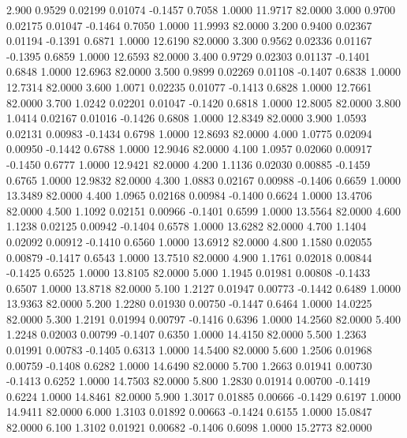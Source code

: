    2.900   0.9529   0.02199   0.01074  -0.1457   0.7058   1.0000  11.9717  82.0000
   3.000   0.9700   0.02175   0.01047  -0.1464   0.7050   1.0000  11.9993  82.0000
   3.200   0.9400   0.02367   0.01194  -0.1391   0.6871   1.0000  12.6190  82.0000
   3.300   0.9562   0.02336   0.01167  -0.1395   0.6859   1.0000  12.6593  82.0000
   3.400   0.9729   0.02303   0.01137  -0.1401   0.6848   1.0000  12.6963  82.0000
   3.500   0.9899   0.02269   0.01108  -0.1407   0.6838   1.0000  12.7314  82.0000
   3.600   1.0071   0.02235   0.01077  -0.1413   0.6828   1.0000  12.7661  82.0000
   3.700   1.0242   0.02201   0.01047  -0.1420   0.6818   1.0000  12.8005  82.0000
   3.800   1.0414   0.02167   0.01016  -0.1426   0.6808   1.0000  12.8349  82.0000
   3.900   1.0593   0.02131   0.00983  -0.1434   0.6798   1.0000  12.8693  82.0000
   4.000   1.0775   0.02094   0.00950  -0.1442   0.6788   1.0000  12.9046  82.0000
   4.100   1.0957   0.02060   0.00917  -0.1450   0.6777   1.0000  12.9421  82.0000
   4.200   1.1136   0.02030   0.00885  -0.1459   0.6765   1.0000  12.9832  82.0000
   4.300   1.0883   0.02167   0.00988  -0.1406   0.6659   1.0000  13.3489  82.0000
   4.400   1.0965   0.02168   0.00984  -0.1400   0.6624   1.0000  13.4706  82.0000
   4.500   1.1092   0.02151   0.00966  -0.1401   0.6599   1.0000  13.5564  82.0000
   4.600   1.1238   0.02125   0.00942  -0.1404   0.6578   1.0000  13.6282  82.0000
   4.700   1.1404   0.02092   0.00912  -0.1410   0.6560   1.0000  13.6912  82.0000
   4.800   1.1580   0.02055   0.00879  -0.1417   0.6543   1.0000  13.7510  82.0000
   4.900   1.1761   0.02018   0.00844  -0.1425   0.6525   1.0000  13.8105  82.0000
   5.000   1.1945   0.01981   0.00808  -0.1433   0.6507   1.0000  13.8718  82.0000
   5.100   1.2127   0.01947   0.00773  -0.1442   0.6489   1.0000  13.9363  82.0000
   5.200   1.2280   0.01930   0.00750  -0.1447   0.6464   1.0000  14.0225  82.0000
   5.300   1.2191   0.01994   0.00797  -0.1416   0.6396   1.0000  14.2560  82.0000
   5.400   1.2248   0.02003   0.00799  -0.1407   0.6350   1.0000  14.4150  82.0000
   5.500   1.2363   0.01991   0.00783  -0.1405   0.6313   1.0000  14.5400  82.0000
   5.600   1.2506   0.01968   0.00759  -0.1408   0.6282   1.0000  14.6490  82.0000
   5.700   1.2663   0.01941   0.00730  -0.1413   0.6252   1.0000  14.7503  82.0000
   5.800   1.2830   0.01914   0.00700  -0.1419   0.6224   1.0000  14.8461  82.0000
   5.900   1.3017   0.01885   0.00666  -0.1429   0.6197   1.0000  14.9411  82.0000
   6.000   1.3103   0.01892   0.00663  -0.1424   0.6155   1.0000  15.0847  82.0000
   6.100   1.3102   0.01921   0.00682  -0.1406   0.6098   1.0000  15.2773  82.0000
